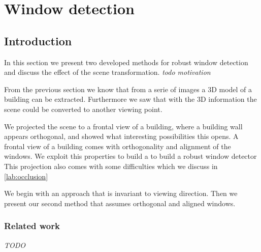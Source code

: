 





%
%




\section{Window detection}


\label{chap:windowDetection}
\subsection{Introduction}

In this section we present two developed methods for robust window detection and
discuss the effect of the scene transformation.
\emph{ todo motivation}

From the previous section we know that from a serie of images a 3D model of a
building can be extracted. Furthermore we saw that with the 3D information the
scene could be converted to another viewing point. 

We projected the scene to a frontal view of a building, where a building wall appears
orthogonal, and showed what interesting possibilities this opens.
A frontal view of a building comes with orthogonality and alignment of the
windows. We exploit this properties to build a to build a robust window detector
This projection also comes with some difficulties which we discuss in \ref{lab:occlusion}


We begin with an approach that is invariant to viewing direction.  Then we
present our second method that assumes orthogonal and aligned windows.


\subsubsection{Related work}
\emph{TODO}


